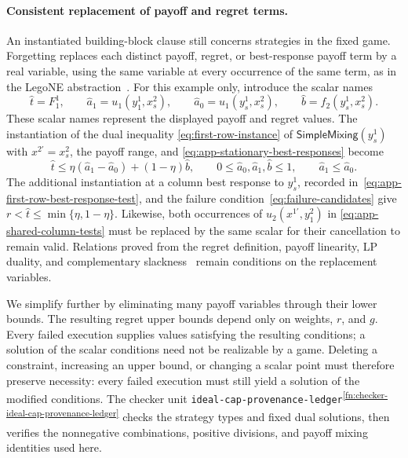 \documentclass[11pt]{article}
\theoremstyle{remark}
\theoremstyle{plain}
\newcommand{\sm}{\mathsf{SimpleMixing}}
\begin{document}
\paragraph{Consistent replacement of payoff and regret terms.}
An instantiated building-block clause still concerns strategies
in the fixed game. Forgetting replaces each distinct payoff,
regret, or best-response payoff term by a real variable, using the
same variable at every occurrence of the same term,
as in the LegoNE abstraction~\cite{computeraided2026,legone2026}.
For this example only, introduce the scalar names
\begin{equation}
 \widehat t=F_1^1,\qquad
 \widehat a_1=u_1(y_1^1,x_s^2),\qquad
 \widehat a_0=u_1(y_s^1,x_s^2),\qquad
 \widehat b=f_2(y_s^1,x_s^2).
 \label{eq:app-scalar-renaming}
\end{equation}
These scalar names represent the displayed payoff and regret values.
The instantiation of the dual inequality
\eqref{eq:first-row-instance} of $\sm(y_s^1)$ with
$x^{2\prime}=x_s^2$, the payoff range, and
\eqref{eq:app-stationary-best-responses} become
\begin{equation}
 \widehat t\le\eta(\widehat a_1-\widehat a_0)
                      +(1-\eta)\widehat b,\qquad
 0\le\widehat a_0,\widehat a_1,\widehat b\le1,\qquad
 \widehat a_1\le\widehat a_0.
 \label{eq:app-scalar-first-row-test}
\end{equation}
The additional instantiation at a column best response to $y_s^1$,
recorded in~\eqref{eq:app-first-row-best-response-test}, and the
failure condition~\eqref{eq:failure-candidates} give
$r<\widehat t\le\min\{\eta,1-\eta\}$.
Likewise, both occurrences of $u_2(x^{1\prime},y_1^2)$ in
\eqref{eq:app-shared-column-tests} must be replaced by the same
scalar for their cancellation to remain valid.
Relations proved from the regret definition, payoff linearity,
LP duality, and complementary slackness~\cite{boyd2004}
remain conditions on
the replacement variables.

We simplify further by eliminating many payoff variables through
their lower bounds. The resulting regret upper bounds depend
only on weights, $r$, and $g$. Every failed execution supplies
values satisfying the resulting conditions; a solution of the
scalar conditions need not be realizable by a game.
Deleting a constraint, increasing an upper bound, or changing
a scalar point must therefore preserve necessity: every failed
execution must still yield a solution of the modified conditions.
The checker unit \nolinkurl{ideal-cap-provenance-ledger}\textsuperscript{\ref{fn:checker-ideal-cap-provenance-ledger}}
checks the strategy types and fixed dual solutions, then
verifies the nonnegative combinations, positive divisions,
and payoff mixing identities used here.
\end{document}
